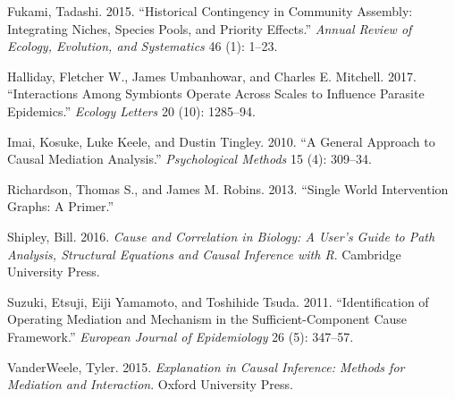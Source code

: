 \documentclass[]{article}
\begin{document}
\hypertarget{refs}{}
\hypertarget{ref-fukami2015historical}{}
Fukami, Tadashi. 2015. ``Historical Contingency in Community Assembly:
Integrating Niches, Species Pools, and Priority Effects.'' \emph{Annual
Review of Ecology, Evolution, and Systematics} 46 (1): 1--23.

\hypertarget{ref-halliday2017interactions}{}
Halliday, Fletcher W., James Umbanhowar, and Charles E. Mitchell. 2017.
``Interactions Among Symbionts Operate Across Scales to Influence
Parasite Epidemics.'' \emph{Ecology Letters} 20 (10): 1285--94.

\hypertarget{ref-imai2010general}{}
Imai, Kosuke, Luke Keele, and Dustin Tingley. 2010. ``A General Approach
to Causal Mediation Analysis.'' \emph{Psychological Methods} 15 (4):
309--34.

\hypertarget{ref-richardson2013primer}{}
Richardson, Thomas S., and James M. Robins. 2013. ``Single World
Intervention Graphs: A Primer.''

\hypertarget{ref-shipley2016cause}{}
Shipley, Bill. 2016. \emph{Cause and Correlation in Biology: A User's
Guide to Path Analysis, Structural Equations and Causal Inference with
R}. Cambridge University Press.

\hypertarget{ref-suzuki2011identification}{}
Suzuki, Etsuji, Eiji Yamamoto, and Toshihide Tsuda. 2011.
``Identification of Operating Mediation and Mechanism in the
Sufficient-Component Cause Framework.'' \emph{European Journal of
Epidemiology} 26 (5): 347--57.

\hypertarget{ref-vanderweele2015explanation}{}
VanderWeele, Tyler. 2015. \emph{Explanation in Causal Inference: Methods
for Mediation and Interaction}. Oxford University Press.
\end{document}
